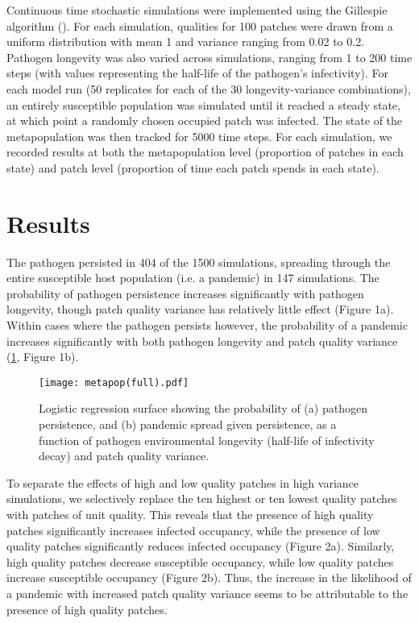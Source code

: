 \documentclass{svjour3}
\begin{document}
Continuous time stochastic simulations were implemented using the Gillespie algorithm (\cite{Gillespie1977}).  For each simulation, qualities for 100 patches were drawn from a uniform distribution with mean 1 and variance ranging from 0.02 to 0.2.  Pathogen longevity was also varied across simulations, ranging from 1 to 200 time steps (with values representing the half-life of the pathogen's infectivity).  For each model run (50 replicates for each of the 30 longevity-variance combinations), an entirely susceptible population was simulated until it reached a steady state, at which point a randomly chosen occupied patch was infected.  The state of the metapopulation was then tracked for 5000 time steps.  For each simulation, we recorded results at both the metapopulation level (proportion of patches in each state) and patch level (proportion of time each patch spends in each state).

\section{Results}
\label{results}

The pathogen persisted in 404 of the 1500 simulations, spreading through the entire susceptible host population (i.e. a pandemic) in 147 simulations.  The probability of pathogen persistence increases significantly with pathogen longevity, though patch quality variance has relatively little effect (Figure 1a).  Within cases where the pathogen persists however, the probability of a pandemic increases significantly with both pathogen longevity and patch quality variance (\ref{poutcome}, Figure 1b).

\begin{figure}
\label{poutcome}
\centering
\texttt{[image: metapop(full).pdf]}
\caption{Logistic regression surface showing the probability of (a) pathogen persistence, and (b) pandemic spread given persistence, as a function of pathogen environmental longevity (half-life of infectivity decay) and patch quality variance.}
\end{figure}   

To separate the effects of high and low quality patches in high variance simulations, we selectively replace the ten highest or ten lowest quality patches with patches of unit quality. This reveals that the presence of high quality patches significantly increases infected occupancy, while the presence of low quality patches significantly reduces infected occupancy (Figure 2a).  Similarly, high quality patches decrease susceptible occupancy, while low quality patches increase susceptible occupancy (Figure 2b).  Thus, the increase in the likelihood of a pandemic with increased patch quality variance seems to be attributable to the presence of high quality patches.
\end{document}
